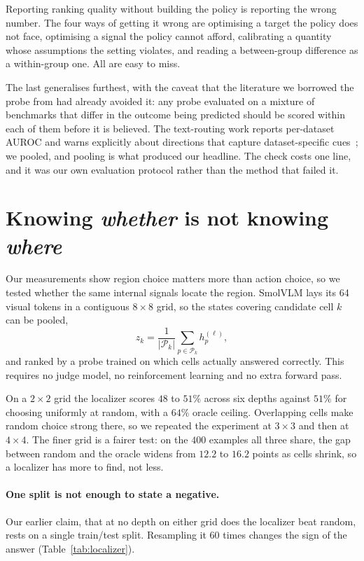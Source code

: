 \documentclass[10pt,twocolumn]{article}
\theoremstyle{plain}
\begin{document}
Reporting ranking quality without building the policy is reporting the wrong
number. The four ways of getting it wrong are optimising a target the policy
does not face, optimising a signal the policy cannot afford, calibrating a
quantity whose assumptions the setting violates, and reading a between-group
difference as a within-group one. All are easy to miss.

The last generalises furthest, with the caveat that the
literature we borrowed the probe from had already avoided it: any probe
evaluated on a mixture of benchmarks that differ in the outcome being predicted
should be scored within each of them before it is believed. The text-routing
work reports per-dataset AUROC and warns explicitly about directions that
capture dataset-specific cues~\cite{cencerrado}; we pooled, and pooling is what
produced our headline. The check costs one line, and it was our own evaluation
protocol rather than the method that failed it.


\appendix

\section{Knowing \emph{whether} is not knowing \emph{where}}
\label{sec:localizer}

Our measurements show region choice matters more than action choice, so we
tested whether the same internal signals locate the region. SmolVLM lays its 64
visual tokens in a contiguous $8\times8$ grid, so the states covering candidate
cell $k$ can be pooled,
\begin{equation}
z_k = \frac{1}{|\mathcal{P}_k|}\sum_{p \in \mathcal{P}_k} h^{(\ell)}_p,
\end{equation}
and ranked by a probe trained on which cells actually answered correctly. This
requires no judge model, no reinforcement learning and no extra forward pass.

On a $2\times2$ grid the localizer scores $48$ to $51\%$ across six depths
against $51\%$ for choosing uniformly at random, with a $64\%$ oracle ceiling.
Overlapping cells make random choice strong there, so we repeated the experiment
at $3\times3$ and then at $4\times4$. The finer grid is a fairer test: on the
$400$ examples all three share, the gap between random and the oracle widens
from $12.2$ to $16.2$ points as cells shrink, so a localizer has more to find,
not less.

\paragraph{One split is not enough to state a negative.} Our earlier claim,
that at no depth on either grid does the localizer beat random, rests on a
single train/test split. Resampling it $60$ times changes the sign of the
answer (Table~\ref{tab:localizer}).
\end{document}

